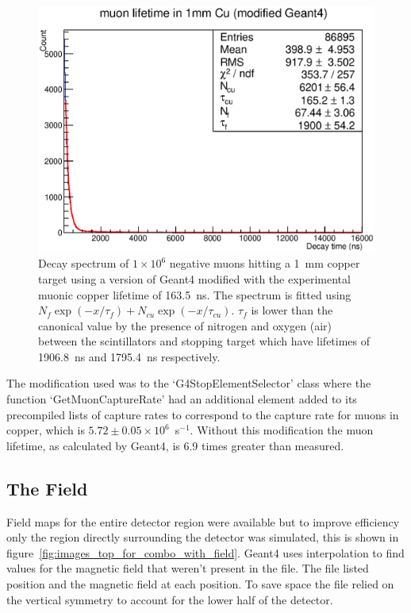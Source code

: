 \begin{figure}[hptb]
  \centering
    \includegraphics[width=.9\textwidth]{images/mu-_lifetime_in_cu_modded_g4.eps}
  \caption{Decay spectrum of \(1\times10^6\) negative muons hitting a 1~mm copper target using a version of Geant4 modified with the experimental muonic copper lifetime of 163.5~ns. The spectrum is fitted using \(N_f\exp(-x/\tau_f) +  N_{cu}\exp(-x/\tau_{cu})\). \(\tau_f\) is lower than the canonical value by the presence of nitrogen and oxygen (air) between the scintillators and stopping target which have lifetimes of 1906.8~ns and 1795.4~ns respectively.}
  \label{fig:images_mu-_lifetime_in_cu_modded_g4}
\end{figure}

The modification used was to the `G4StopElementSelector' class where the function `GetMuonCaptureRate' had an additional element added to its precompiled lists of capture rates to correspond to the capture rate for muons in copper, which is \(5.72\pm0.05\times10^6\)~s\(^{-1}\). Without this modification the muon lifetime, as calculated by Geant4, is 6.9 times greater than measured.

\subsection{The Field} %
\label{sec:the_field}
Field maps for the entire detector region were available but to improve efficiency only the region directly surrounding the detector was simulated, this is shown in figure~\ref{fig:images_top_for_combo_with_field}. Geant4 uses interpolation to find values for the magnetic field that weren't present in the file. The file listed position and the magnetic field at each position. To save space the file relied on the vertical symmetry to account for the lower half of the detector. 

